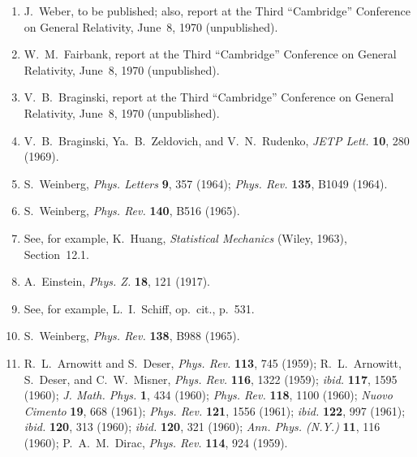 \begin{enumerate}
  \item {}\label{ch10-ref-19}
  J.~Weber, to be published; also, report at the Third ``Cambridge''
  Conference on General Relativity, June~8, 1970 (unpublished).

  \item {}\label{ch10-ref-20}
  W.~M.~Fairbank, report at the Third ``Cambridge'' Conference on General
  Relativity, June~8, 1970 (unpublished).

  \item {}\label{ch10-ref-21}
  V.~B.~Braginski, report at the Third ``Cambridge'' Conference on General
  Relativity, June~8, 1970 (unpublished).

  \item {}\label{ch10-ref-22}
  V.~B.~Braginski, Ya.~B.~Zeldovich, and V.~N.~Rudenko,
  \emph{JETP Lett.} \textbf{10}, 280 (1969).

  \item {}\label{ch10-ref-23}
  S.~Weinberg, \emph{Phys. Letters} \textbf{9}, 357 (1964);
  \emph{Phys. Rev.} \textbf{135}, B1049 (1964).

  \item {}\label{ch10-ref-24}
  S.~Weinberg, \emph{Phys. Rev.} \textbf{140}, B516 (1965).

  \item {}\label{ch10-ref-25}
  See, for example, K.~Huang, \emph{Statistical Mechanics} (Wiley, 1963),
  Section~12.1.

  \item {}\label{ch10-ref-26}
  A.~Einstein, \emph{Phys. Z.} \textbf{18}, 121 (1917).

  \item {}\label{ch10-ref-27}
  See, for example, L.~I.~Schiff, op.\ cit., p.~531.

  \item {}\label{ch10-ref-28}
  S.~Weinberg, \emph{Phys. Rev.} \textbf{138}, B988 (1965).

  \item {}\label{ch10-ref-29}
  R.~L.~Arnowitt and S.~Deser, \emph{Phys. Rev.} \textbf{113}, 745
  (1959); R.~L.~Arnowitt, S.~Deser, and C.~W.~Misner,
  \emph{Phys. Rev.} \textbf{116}, 1322 (1959); \emph{ibid.}
  \textbf{117}, 1595 (1960); \emph{J. Math. Phys.} \textbf{1}, 434
  (1960); \emph{Phys. Rev.} \textbf{118}, 1100 (1960);
  \emph{Nuovo Cimento} \textbf{19}, 668 (1961); \emph{Phys. Rev.}
  \textbf{121}, 1556 (1961); \emph{ibid.} \textbf{122}, 997 (1961);
  \emph{ibid.} \textbf{120}, 313 (1960); \emph{ibid.} \textbf{120},
  321 (1960); \emph{Ann. Phys. (N.Y.)} \textbf{11}, 116 (1960);
  P.~A.~M.~Dirac, \emph{Phys. Rev.} \textbf{114}, 924 (1959).


\end{enumerate}
